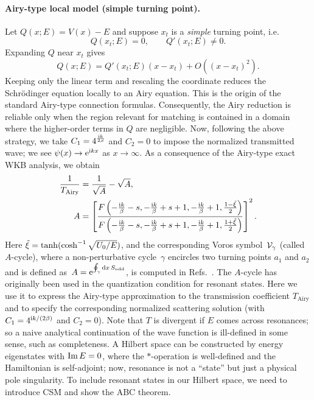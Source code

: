 \paragraph{Airy-type local model (simple turning point).}
Let $Q(x;E)=V(x)-E$ and suppose $x_t$ is a \textit{simple} turning point, i.e.
\begin{equation}
Q(x_t;E)=0,\qquad Q'(x_t;E)\neq 0.
\end{equation}
Expanding $Q$ near $x_t$ gives
\begin{equation}
Q(x;E)=Q'(x_t;E)(x-x_t)+O\!\left((x-x_t)^2\right).
\end{equation}
Keeping only the linear term and rescaling the coordinate reduces the Schr\"odinger equation locally to an Airy
equation. This is the origin of the standard Airy-type connection formulas.
Consequently, the Airy reduction is reliable only when the region relevant for matching is contained in a domain
where the higher-order terms in $Q$ are negligible.
Now, following the above strategy, we take $C_1=4^{\frac{\mathrm{i} k}{2\beta}}$ and $C_2=0$ to impose the normalized transmitted wave; we see $\psi(x)\to \mathrm{e}^{\mathrm{i} kx}$ as $x\to\infty$. As a consequence of the Airy-type exact WKB analysis, we obtain
\begin{align}
  \frac{1}{T_{\text{Airy}}} &= \frac{1}{\sqrt{A}} - \sqrt{A},\\ 
   A &= \left[
    \frac{F\left( -\frac{\mathrm{i} k}{\beta}-s, -\frac{\mathrm{i} k}{\beta}+s+1, -\frac{\mathrm{i} k}{\beta}+1, \frac{1-\Tilde{\xi}}{2} \right)}
    {F\left( -\frac{\mathrm{i} k}{\beta}-s, -\frac{\mathrm{i} k}{\beta}+s+1, -\frac{\mathrm{i} k}{\beta}+1, \frac{1+\Tilde{\xi}}{2} \right)}
    \right]^2 .
\end{align}
Here $\Tilde{\xi}=\tanh(\cosh^{-1}\sqrt{U_0/E})$,
and the corresponding Voros symbol~$\mathcal{V}_\gamma$ (called $A$-cycle), where a non-perturbative cycle~$\gamma$ encircles two turning points $a_1$ and $a_2$ and is defined as~$A=\mathrm{e}^{\oint_\gamma \mathrm{d} x\, S_{\mathrm{odd}}}$, is computed in Refs.~\cite{Morikawa:2025grx,Morikawa:2025xjq}.
The $A$-cycle has originally been used in the quantization condition for resonant states. Here we use it to express the Airy-type approximation to the transmission coefficient $T_{\text{Airy}}$ and to specify the corresponding normalized scattering solution (with $C_1=4^{\mathrm{i} k/(2\beta)}$ and $C_2=0$).
Note that $T$ is divergent if $E$ comes across resonances; so a naive analytical continuation of the wave function is ill-defined in some sense, such as completeness. A Hilbert space can be constructed by energy eigenstates with $\operatorname{Im} E=0$, where the $*$-operation is well-defined and the Hamiltonian is self-adjoint; now, resonance is not a ``state'' but just a physical pole singularity. To include resonant states in our Hilbert space, we need to introduce CSM and show the ABC theorem.

